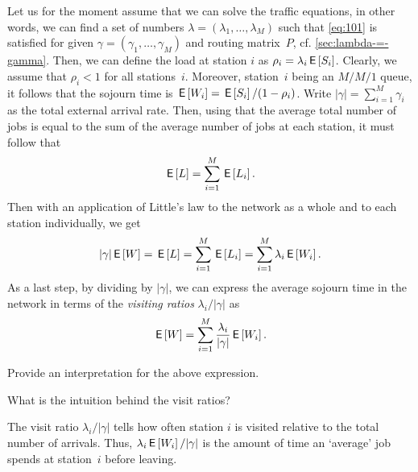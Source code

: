 \documentclass[companion]{subfiles}
\begin{document}
Let us for the moment assume that we can solve the traffic equations, in other words, we can find a set of numbers $\lambda =(\lambda_1, \ldots, \lambda_M)$ such that \cref{eq:101} is satisfied for given $\gamma =(\gamma_1, \ldots, \gamma_M)$ and routing matrix~$P$, cf.
\cref{sec:lambda-=-gamma}.
Then, we can define the load at station $i$ as $\rho_i = \lambda_i \,\mathsf{E}\left[S_i\right]$.
Clearly, we assume that $\rho_i < 1$ for all stations~$i$.
Moreover, station~$i$ being an $M/M/1$ queue, it follows that the sojourn time is $\,\mathsf{E}\left[W_i\right] = \,\mathsf{E}\left[S_i\right]/(1-\rho_i)$.
Write $|\gamma|= \sum_{i=1}^M \gamma_i$ as the total external arrival rate.
Then, using that the average total number of jobs is equal to the sum of the average number of jobs at each station, it must follow that
\begin{equation*}
 \,\mathsf{E}\left[L\right] = \sum_{i=1}^M \,\mathsf{E}\left[L_i\right].
\end{equation*}
Then with an application of Little's law to the network as a whole and to each station individually, we get
\begin{equation*}
  |\gamma| \,\mathsf{E}\left[W\right] = \,\mathsf{E}\left[L\right] = \sum_{i=1}^M \,\mathsf{E}\left[L_i\right] = \sum_{i=1}^M \lambda_i \,\mathsf{E}\left[W_i\right]. 
\end{equation*}
As a last step, by dividing by $|\gamma|$, we can express the average sojourn time in the network in terms of the \emph{visiting ratios} $\lambda_i/|\gamma|$ as
\begin{equation*}
 \,\mathsf{E}\left[W\right] = \sum_{i=1}^M \frac{\lambda_i}{|\gamma|} \,\mathsf{E}\left[W_i\right]. 
\end{equation*}

\begin{exercise}\label{ex:on-5}
  Provide an interpretation for the above expression.
\begin{hint}
    What  is the intuition behind the visit ratios?
\end{hint}
\begin{solution}
  The visit ratio $\lambda_i/|\gamma|$ tells how often station $i$ is visited relative to the total number of arrivals.
  Thus, $\lambda_i \,\mathsf{E}\left[W_i\right] /|\gamma|$ is the amount of time an `average' job spends at station~$i$ before leaving.
\end{solution}
\end{exercise}
\end{document}
